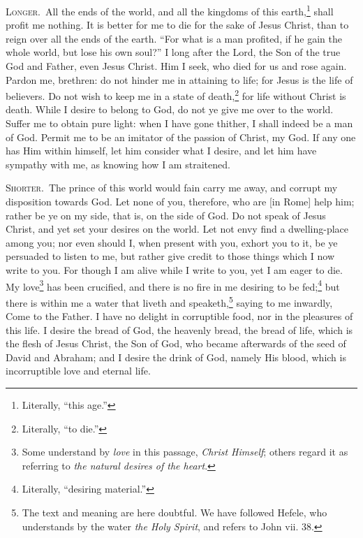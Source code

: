 \textsc{Longer.}~All the ends of the world, and all the kingdoms of this earth,\footnote{Literally, “this age.”} shall profit me nothing. It is better for me to die for the sake of Jesus Christ, than to reign over all the ends of the earth. “For what is a man profited, if he gain the whole world, but lose his own soul?” I long after the Lord, the Son of the true God and Father, even Jesus Christ. Him I seek, who died for us and rose again. Pardon me, brethren: do not hinder me in attaining to life; for Jesus is the life of believers. Do not wish to keep me in a state of death,\footnote{Literally, “to die.”} for life without Christ is death. While I desire to belong to God, do not ye give me over to the world. Suffer me to obtain pure light: when I have gone thither, I shall indeed be a man of God. Permit me to be an imitator of the passion of Christ, my God. If any one has Him within himself, let him consider what I desire, and let him have sympathy with me, as knowing how I am straitened.


\textsc{Shorter.}~The prince of this world would fain carry me away, and corrupt my disposition towards God. Let none of you, therefore, who are [in Rome] help him; rather be ye on my side, that is, on the side of God. Do not speak of Jesus Christ, and yet set your desires on the world. Let not envy find a dwelling-place among you; nor even should I, when present with you, exhort you to it, be ye persuaded to listen to me, but rather give credit to those things which I now write to you. For though I am alive while I write to you, yet I am eager to die. My love\footnote{Some understand by \emph{love} in this passage, \emph{Christ Himself}; others regard it as referring to \emph{the natural desires of the heart}.} has been crucified, and there is no  fire in me desiring to be fed;\footnote{Literally, “desiring material.”} but there is within me a water that liveth and speaketh,\footnote{The text and meaning are here doubtful. We have followed Hefele, who understands by the water \emph{the Holy Spirit}, and refers to John vii. 38.} saying to me inwardly, Come to the Father. I have no delight in corruptible food, nor in the pleasures of this life. I desire the bread of God, the heavenly bread, the bread of life, which is the flesh of Jesus Christ, the Son of God, who became afterwards of the seed of David and Abraham; and I desire the drink of God, namely His blood, which is incorruptible love and eternal life.

